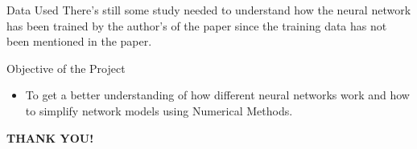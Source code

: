 \documentclass[13.5pt, aspectratio=169]{beamer}
\begin{document}
\begin{frame}{Data Used}
    There's still some study needed to understand how the neural network has been trained by the author's of the paper since the training data has not been mentioned in the paper.
\end{frame}

\begin{frame}{Objective of the Project}

    \begin{itemize}
        \item<1->[] To get a better understanding of how different neural networks work and how to simplify network models using Numerical Methods.
    \end{itemize}

\end{frame}

\begin{frame}
    \begin{center}
        \LARGE \textbf{THANK YOU!}
    \end{center}
\end{frame}
\end{document}
